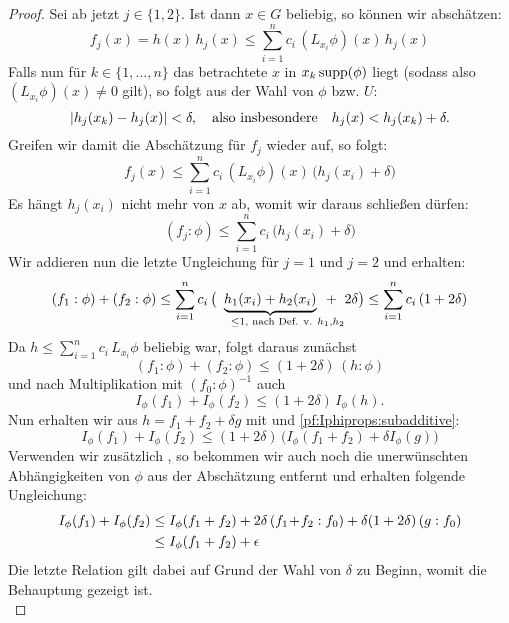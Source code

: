 \begin{proof}
    Sei ab jetzt $j\in\{1,2\}$.
    Ist dann $x\in G$ beliebig, so können wir abschätzen:
    \[  f_j(x) = h(x) \, h_j(x) \leq \sum_{i=1}^n c_i\,(L_{x_i}\phi)(x) \, h_j(x) \]
    Falls nun für $k\in\{1,\ldots,n\}$ das betrachtete $x$ in 
    $x_k \operatorname{supp}(\phi)$ liegt (sodass also $(L_{x_i}\phi)(x)\neq0$ gilt), 
    so folgt aus der Wahl von $\phi$ bzw. $U$:
    \[ \lvert h_j(x_k) - h_j(x) \rvert < \delta,  \quad\text{also insbesondere}\quad
        h_j(x) < h_j(x_k) + \delta
    . \]
    Greifen wir damit die Abschätzung für $f_j$ wieder auf, so folgt:
    \[ 
        f_j(x) 
        \leq \sum_{i=1}^n c_i\,(L_{x_i}\phi)(x) \, \bigl( h_j(x_i) + \delta \bigr)
    \]
    Es hängt $h_j(x_i)$ nicht mehr von $x$ ab, womit wir daraus schließen dürfen:
    \[ (f_j : \phi) \leq \sum_{i=1}^n c_i \, \bigl( h_j(x_i) + \delta \bigr) \]
    Wir addieren nun die letzte Ungleichung für $j=1$ und $j=2$ und erhalten:
    \[ (f_1 : \phi) + (f_2 : \phi) 
        \leq \sum_{i=1}^n c_i \, \bigl( 
        \underbrace{ h_1(x_i) + h_2(x_i) }_{
            \hspace*{10pt} \leq 1, \text{ nach Def. v. } h_1,h_2 \hspace*{-15pt} }
        + \;\; 2\delta \bigr)
        \leq \sum_{i=1}^n c_i \, (1+2\delta)
    \]
    Da $h\leq \sum_{i=1}^n c_i\,L_{x_i}\phi$ beliebig war, folgt daraus zunächst
    \[ (f_1 : \phi) + (f_2 : \phi)  \leq  (1+2\delta) \, (h : \phi)  \]
    und nach Multiplikation mit $(f_0 : \phi)^{-1}$ auch
    \[ I_\phi(f_1) + I_\phi(f_2)  \leq  (1+2\delta) \, I_\phi(h) . \]
    Nun erhalten wir aus $h=f_1+f_2+\delta g$ mit 
     und \ref{pf:Iphiprops:subadditive}:
    \[ 
        I_\phi(f_1) + I_\phi(f_2) 
        \leq (1+2\delta) \, \bigl(
        I_\phi(f_1+f_2) + \delta I_\phi(g) 
        \bigr)
    \]
    Verwenden wir zusätzlich , so bekommen wir auch
    noch die unerwünschten Abhängigkeiten von $\phi$ aus der Abschätzung
    entfernt und erhalten folgende Ungleichung:
    \begin{align*}
        I_\phi(f_1) + I_\phi(f_2) 
        &\leq I_\phi(f_1+f_2) + 2\delta \, (f_1\mkern1mu{+}\mkern1mu f_2 : f_0)
        + \delta(1+2\delta) \, (g : f_0)
        \\
        &\leq I_\phi(f_1+f_2) + \epsilon
    \end{align*}
    Die letzte Relation gilt dabei auf Grund der Wahl von $\delta$ zu Beginn,
    womit die Behauptung gezeigt ist.
    \\
\end{proof}

